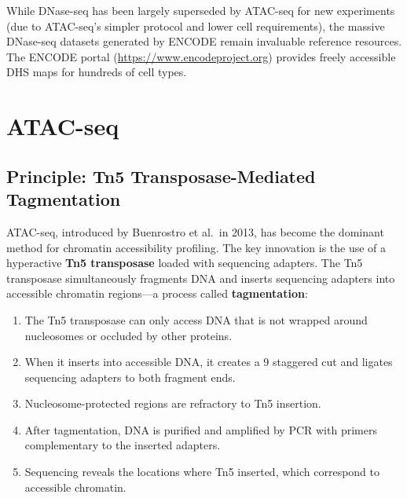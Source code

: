 \begin{tipbox}
While DNase-seq has been largely superseded by ATAC-seq for new experiments (due to ATAC-seq's simpler protocol and lower cell requirements), the massive DNase-seq datasets generated by ENCODE remain invaluable reference resources. The ENCODE portal (\url{https://www.encodeproject.org}) provides freely accessible DHS maps for hundreds of cell types.
\end{tipbox}

\section{ATAC-seq}
\label{sec:chromatin:atac}

\subsection{Principle: Tn5 Transposase-Mediated Tagmentation}
\label{subsec:chromatin:atac-principle}

\acrfull{ATAC-seq}, introduced by Buenrostro et al.\ in 2013, has become the dominant method for chromatin accessibility profiling. The key innovation is the use of a hyperactive \textbf{Tn5 transposase} loaded with sequencing adapters. The Tn5 transposase simultaneously fragments DNA and inserts sequencing adapters into accessible chromatin regions---a process called \textbf{tagmentation}:

\begin{enumerate}[itemsep=2pt]
  \item The Tn5 transposase can only access DNA that is not wrapped around nucleosomes or occluded by other proteins.
  \item When it inserts into accessible DNA, it creates a 9\basepair{} staggered cut and ligates sequencing adapters to both fragment ends.
  \item Nucleosome-protected regions are refractory to Tn5 insertion.
  \item After tagmentation, DNA is purified and amplified by PCR with primers complementary to the inserted adapters.
  \item Sequencing reveals the locations where Tn5 inserted, which correspond to accessible chromatin.
\end{enumerate}


